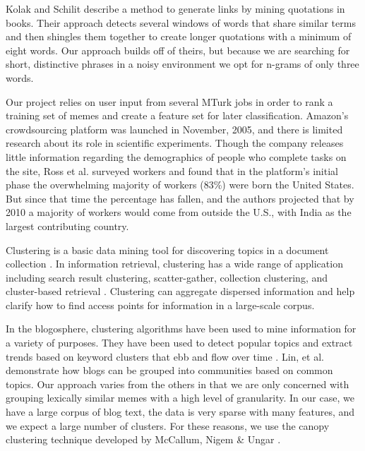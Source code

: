 \documentclass{sig-alternate}
\begin{document}
Kolak and Schilit \cite{Kolak2008} describe a method to generate links by mining quotations in books. Their approach detects several windows of words that share similar terms and then shingles them together to create longer quotations with a minimum of eight words. Our approach builds off of theirs, but because we are searching for short, distinctive phrases in a noisy environment we opt for n-grams of only three words.
 
Our project relies on user input from several MTurk jobs in order to rank a training set of memes and create a feature set for later classification. Amazon's crowdsourcing platform was launched in November, 2005, and there is limited research about its role in scientific experiments. Though the company releases little information regarding the demographics of people who complete tasks on the site, Ross et al. \cite{Ross2010} surveyed workers and found that in the platform's initial phase the overwhelming majority of workers (83\%) were born the United States. But since that time the percentage has fallen, and the authors projected that by 2010 a majority of workers would come from outside the U.S., with India as the largest contributing country.

Clustering is a basic data mining tool for discovering topics in a document collection \cite{Jayabharathy2011}. In information retrieval, clustering has a wide range of application including search result clustering, scatter-gather, collection clustering, and cluster-based retrieval \cite{citeulike:2709781}. Clustering can aggregate dispersed information and help clarify how to find access points for information in a large-scale corpus.

In the blogosphere, clustering algorithms have been used to mine information for a variety of purposes. They have been used to detect popular topics and extract trends based on keyword clusters that ebb and flow over time \cite{Qamra2006,Bansal}. Lin, et al. \cite{Lin2007} demonstrate how blogs can be grouped into communities based on common topics. Our approach varies from the others in that we are only concerned with grouping lexically similar memes with a high level of granularity. In our case, we have a large corpus of blog text, the data is very sparse with many features, and we expect a large number of clusters. For these reasons, we use the canopy clustering technique developed by McCallum, Nigem \& Ungar \cite{McCallum2000}.
\end{document}
